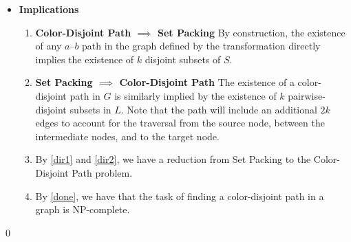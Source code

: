 \documentclass{article}
\begin{document}
\begin{itemize}
\begin{enumerate}
      \end{enumerate}

    \item \textbf{Implications} 
      \begin{enumerate}
        \item \label{dir1} 
        \textbf{Color-Disjoint Path $\implies$ Set Packing}
        By construction, the existence of any $a$--$b$ path in the
        graph defined by the transformation directly implies the
        existence of $k$ disjoint subsets of $S$.

        \item \label{dir2}
        \textbf{Set Packing $\implies$ Color-Disjoint Path}
        The existence of a color-disjoint path in $G$ is similarly 
        implied by the existence of $k$ pairwise-disjoint subsets in
        $L$. Note that the path will include an additional $2k$ edges
        to account for the traversal from the source node, between
        the intermediate nodes, and to the target node.

        \item \label{done} By \ref{dir1} and \ref{dir2}, we have a reduction
        from Set Packing to the Color-Disjoint Path problem.

        \item By \ref{done}, we have that the task of finding a 
        color-disjoint path in a graph is NP-complete.

      \end{enumerate}

  \end{itemize}
  \qed
    
\end{document}

